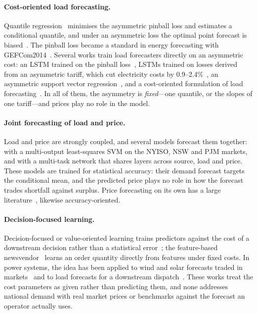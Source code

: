 \paragraph*{Cost-oriented load forecasting.}  Quantile
regression~\parencite{koenker1978regression} minimises the asymmetric pinball
loss and estimates a conditional quantile, and under an asymmetric loss the
optimal point forecast is biased~\parencite{christoffersen1997optimal}.  The
pinball loss became a standard in energy forecasting with
GEFCom2014~\parencite{hong2016gefcom2014, hong2016probabilistic}.  Several
works train load forecasters directly on an asymmetric cost: an LSTM trained
on the pinball loss~\parencite{wang2019pinball}, LSTMs trained on losses
derived from an asymmetric tariff, which cut electricity costs by
0.9--2.4\%~\parencite{lin2020asymmetric}, an asymmetric support vector
regression~\parencite{wu2021svr}, and a cost-oriented formulation of load
forecasting~\parencite{zhang2022costoriented}.  In all of them, the asymmetry
is \emph{fixed}---one quantile, or the slopes of one tariff---and prices play
no role in the model.

\paragraph*{Joint forecasting of load and price.}  Load and price are
strongly coupled, and several models forecast them together:
\textcite{shayeghi2015simultaneous} with a multi-output least-squares SVM on
the NYISO, NSW and PJM markets, and \textcite{li2024joint} with a multi-task
network that shares layers across source, load and price.  These models are
trained for statistical accuracy: their demand forecast targets the
conditional mean, and the predicted price plays no role in how the forecast
trades shortfall against surplus.  Price forecasting on its own has a large
literature~\parencite{weron2014electricity}, likewise accuracy-oriented.

\paragraph*{Decision-focused learning.}  Decision-focused or value-oriented
learning trains predictors against the cost of a downstream decision rather
than a statistical error~\parencite{donti2017taskbased, elmachtoub2022spo};
the feature-based newsvendor~\parencite{ban2019bignewsvendor} learns an order
quantity directly from features under fixed costs.  In power systems, the idea
has been applied to wind and solar forecasts traded in
markets~\parencite{stratigakos2022prescriptive, zhang2024valueoriented} and to
load forecasts for a downstream dispatch~\parencite{donti2017taskbased,
han2020lfednet}.  These works treat the cost parameters as given rather than
predicting them, and none addresses national demand with real market prices
or benchmarks against the forecast an operator actually uses.

